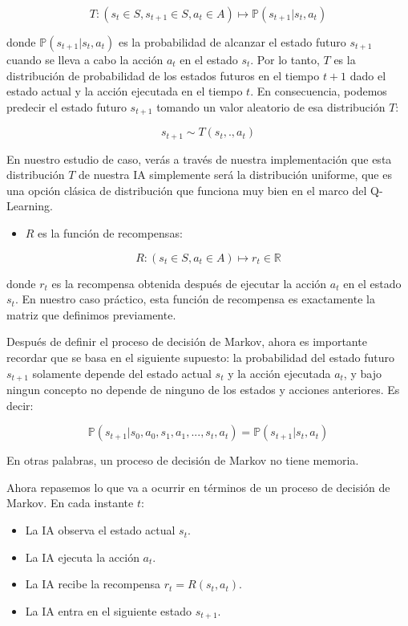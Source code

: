 \documentclass[]{book}
\providecommand{\tightlist}{%
  \setlength{\itemsep}{0pt}\setlength{\parskip}{0pt}}
\begin{document}
\[T : (s_t \in S, s_{t+1} \in S, a_t \in A) \mapsto \mathbb{P}(s_{t+1}|s_t,a_t)\]

donde \(\mathbb {P} (s_{t + 1} | s_t, a_t)\) es la probabilidad de alcanzar el estado futuro \(s_{t + 1}\) cuando se lleva a cabo la acción \(a_t\) en el estado \(s_t\). Por lo tanto, \(T\) es la distribución de probabilidad de los estados futuros en el tiempo \(t + 1\) dado el estado actual y la acción ejecutada en el tiempo \(t\). En consecuencia, podemos predecir el estado futuro \(s_{t + 1}\) tomando un valor aleatorio de esa distribución \(T\):

\[s_{t+1} \sim T(s_t,.,a_t)\]

En nuestro estudio de caso, verás a través de nuestra implementación que esta distribución \(T\) de nuestra IA simplemente será la distribución uniforme, que es una opción clásica de distribución que funciona muy bien en el marco del Q-Learning.

\begin{itemize}
\tightlist
\item
  \(R\) es la función de recompensas:
\end{itemize}

\[R : (s_t \in S, a_t \in A) \mapsto r_t \in \mathbb{R}\]

donde \(r_t\) es la recompensa obtenida después de ejecutar la acción \(a_t\) en el estado \(s_t\). En nuestro caso práctico, esta función de recompensa es exactamente la matriz que definimos previamente.

Después de definir el proceso de decisión de Markov, ahora es importante recordar que se basa en el siguiente supuesto: la probabilidad del estado futuro \(s_{t + 1}\) solamente depende del estado actual \(s_t\) y la acción ejecutada \(a_t\), y bajo ningun concepto no depende de ninguno de los estados y acciones anteriores. Es decir:

\[\mathbb{P}(s_{t+1}|s_0,a_0,s_1,a_1,...,s_t,a_t) = \mathbb{P}(s_{t+1}|s_t,a_t)\]

En otras palabras, un proceso de decisión de Markov no tiene memoria.

\newpage

Ahora repasemos lo que va a ocurrir en términos de un proceso de decisión de Markov. En cada instante \(t\):

\begin{itemize}
\tightlist
\item
  La IA observa el estado actual \(s_t\).
\item
  La IA ejecuta la acción \(a_t\).
\item
  La IA recibe la recompensa \(r_t = R(s_t, a_t)\).
\item
  La IA entra en el siguiente estado \(s_{t+1}\).
\end{itemize}
\end{document}

